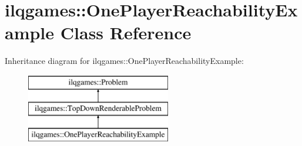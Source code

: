 \hypertarget{classilqgames_1_1_one_player_reachability_example}{}\section{ilqgames\+:\+:One\+Player\+Reachability\+Example Class Reference}
\label{classilqgames_1_1_one_player_reachability_example}
Inheritance diagram for ilqgames\+:\+:One\+Player\+Reachability\+Example\+:\begin{figure}[H]
\begin{center}
\leavevmode
\includegraphics[height=3.000000cm]{classilqgames_1_1_one_player_reachability_example}
\end{center}
\end{figure}
